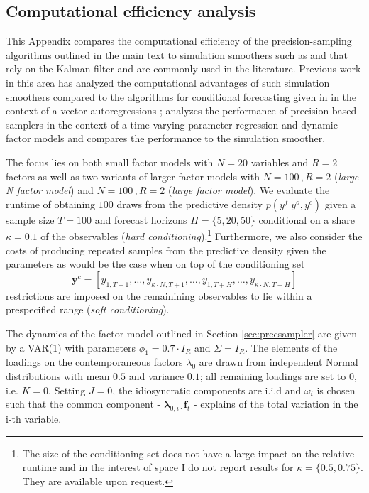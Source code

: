 \documentclass[notitlepage,a4paper,12pt]{article}
\begin{document}
\begin{ThreePartTable}
\section{Computational efficiency analysis}\label{app:simulation}

This Appendix compares the computational efficiency of the precision-sampling algorithms outlined in the main text to simulation smoothers such as \citet{carterkohn1994_biomtr} and \citet{durbinkoopman2002_biomtr} that rely on the Kalman-filter and are commonly used in the literature. Previous work in this area has analyzed the computational advantages of such simulation smoothers compared to the algorithms for conditional forecasting given in \citet{waggonerzha1999_res} in the context of a vector autoregressions \citep{bgl_2015ijf}; \citet{mmp2011_csda} analyzes the performance of precision-based samplers in the context of a time-varying parameter regression and dynamic factor models and compares the performance to the \citet{durbinkoopman2002_biomtr} simulation smoother.

The focus lies on both small factor models with $N=20$ variables and $R=2$ factors as well as two variants of larger factor models with $N=100\,,R=2$ (\textit{large N factor model}) and $N=100\,,R=2$ (\textit{large factor model}).  We evaluate the runtime of obtaining $100$ draws from the predictive density $p(y^f|y^o, y^c)$ given a sample size $T=100$ and forecast horizons $H = \{5, 20, 50\}$ conditional on a share $\kappa = 0.1$ of the observables (\textit{hard conditioning}).\footnote{The size of the conditioning set does not have a large impact on the relative runtime and in the interest of space I do not report results for $\kappa = \{0.5, 0.75\}$. They are available upon request.} Furthermore, we also consider the costs of producing repeated samples from the predictive density given the parameters as would be the case when on top of the conditioning set $$\mathbf{y}^{c} = [y_{1, T+1}, \dots, y_{\kappa \cdot N, T+1}, \dots, y_{1,T+H}, \dots, y_{\kappa \cdot N, T+H}]$$ restrictions are imposed on the remainining observables to lie within a prespecified range (\textit{soft conditioning}).

The dynamics of the factor model outlined in Section \ref{sec:precsampler} are given by a VAR(1) with parameters $\phi_1 = 0.7 \cdot I_R$ and $\Sigma = I_R$. The elements of the loadings on the contemporaneous factors $\lambda_0$ are drawn from independent Normal distributions with mean $0.5$ and variance $0.1$; all remaining loadings are set to 0, i.e. $K=0$. Setting $J=0$, the idiosyncratic components are i.i.d and $\omega_i$ is chosen such that the common component - $\boldsymbol{\lambda}_{0,i\cdot} \mathbf{f}_t$ - explains  of the total variation in the i-th variable. 


\end{ThreePartTable}
\end{document}
